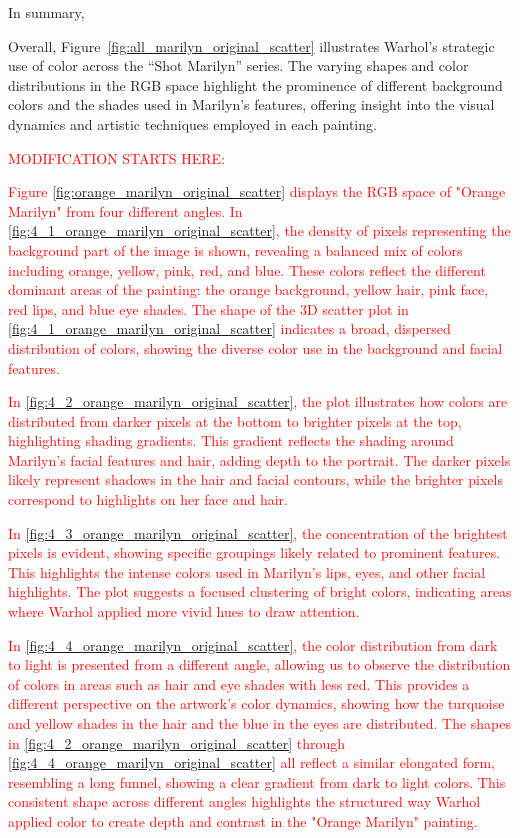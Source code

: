\documentclass{article}
\begin{document}
In summary, 

Overall, Figure~\ref{fig:all_marilyn_original_scatter} illustrates Warhol’s strategic use of color across the “Shot Marilyn” series. The varying shapes and color distributions in the RGB space highlight the prominence of different background colors and the shades used in Marilyn’s features, offering insight into the visual dynamics and artistic techniques employed in each painting.



\iffalse
\textcolor{red}{MODIFICATION STARTS HERE:}

\textcolor{red}{Figure \ref{fig:orange_marilyn_original_scatter} displays the RGB space of "Orange Marilyn" from four
different angles. In \ref{fig:4_1_orange_marilyn_original_scatter}, the density of pixels representing the
background part of the image is shown, revealing a balanced mix of
colors including orange, yellow, pink, red, and blue. These colors
reflect the different dominant areas of the painting: the orange
background, yellow hair, pink face, red lips, and blue eye shades. The
shape of the 3D scatter plot in \ref{fig:4_1_orange_marilyn_original_scatter} indicates a broad, dispersed
distribution of colors, showing the diverse color use in the background
and facial features.}

\textcolor{red}{In \ref{fig:4_2_orange_marilyn_original_scatter}, the plot illustrates how colors are distributed from darker
pixels at the bottom to brighter pixels at the top, highlighting shading
gradients. This gradient reflects the shading around Marilyn's facial
features and hair, adding depth to the portrait. The darker pixels
likely represent shadows in the hair and facial contours, while the
brighter pixels correspond to highlights on her face and hair.}

\textcolor{red}{In \ref{fig:4_3_orange_marilyn_original_scatter}, the concentration of the brightest pixels is evident, showing
specific groupings likely related to prominent features. This highlights
the intense colors used in Marilyn's lips, eyes, and other facial
highlights. The plot suggests a focused clustering of bright colors,
indicating areas where Warhol applied more vivid hues to draw attention.}

\textcolor{red}{In \ref{fig:4_4_orange_marilyn_original_scatter}, the color distribution from dark to light is presented from a
different angle, allowing us to observe the distribution of colors in
areas such as hair and eye shades with less red. This provides a
different perspective on the artwork's color dynamics, showing how the
turquoise and yellow shades in the hair and the blue in the eyes are
distributed. The shapes in \ref{fig:4_2_orange_marilyn_original_scatter} through \ref{fig:4_4_orange_marilyn_original_scatter} all reflect a similar
elongated form, resembling a long funnel, showing a clear gradient from
dark to light colors. This consistent shape across different angles
highlights the structured way Warhol applied color to create depth and
contrast in the "Orange Marilyn" painting.}
\end{document}

